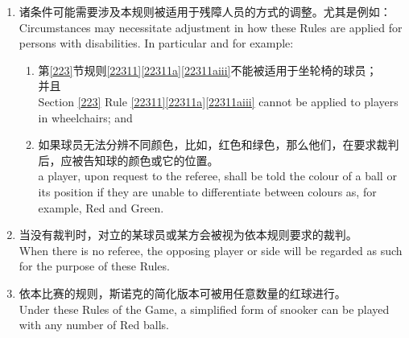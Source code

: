 \begin{enumerate}
    \item 诸条件可能需要涉及本规则被适用于残障人员的方式的调整。尤其是例如：\\
    Circumstances may necessitate adjustment in how these Rules are applied for persons with disabilities. In particular and for example:
    \begin{enumerate}
        \item 第\ref{223}节规则\ref{22311}\ref{22311a}\ref{22311aiii}不能被适用于坐轮椅的球员；\\并且\\
        Section \ref{223} Rule \ref{22311}\ref{22311a}\ref{22311aiii} cannot be applied to players in wheelchairs; and
        \item 如果球员无法分辨不同颜色，比如，红色和绿色，那么他们，在要求裁判后，应被告知球的颜色或它的位置。\\
        a player, upon request to the referee, shall be told the colour of a ball or its position if they are unable to differentiate between colours as, for example, Red and Green.
    \end{enumerate}
    \item 当没有裁判时，对立的某球员或某方会被视为依本规则要求的裁判。\\
    When there is no referee, the opposing player or side will be regarded as such for the purpose of these Rules.
    \item 依本比赛的规则，斯诺克的简化版本可被用任意数量的红球进行。\\
    Under these Rules of the Game, a simplified form of snooker can be played with any number of Red balls.
\end{enumerate}
